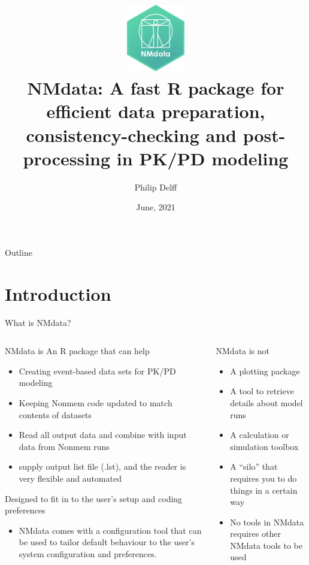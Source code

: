 \documentclass[
  8pt,
  ignorenonframetext,
  aspectratio=169]{beamer}
\title{\includegraphics[width=1in,height=\textheight]{../../man/figures/NMdata_logo_v01.png}\\
NMdata: A fast R package for efficient data preparation,
consistency-checking and post-processing in PK/PD modeling}
\author{Philip Delff}
\date{June, 2021}
\providecommand{\tightlist}{%
  \setlength{\itemsep}{0pt}\setlength{\parskip}{0pt}}
\begin{document}
\frame{\titlepage}

\begin{frame}
\end{frame}

\begin{frame}{Outline}
\protect\hypertarget{outline}{}
\tableofcontents[hideallsubsections]
\end{frame}

\hypertarget{introduction}{%
\section{Introduction}\label{introduction}}

\begin{frame}{What is NMdata?}
\protect\hypertarget{what-is-nmdata}{}
\begin{columns}[T]
\begin{column}{0.48\textwidth}
\begin{block}{NMdata is}
\protect\hypertarget{nmdata-is}{}
An R package that can help

\begin{itemize}
\tightlist
\item
  Creating event-based data sets for PK/PD modeling
\item
  Keeping Nonmem code updated to match contents of datasets
\item
  Read all output data and combine with input data from Nonmem runs
\item
  supply output list file (.lst), and the reader is very flexible and
  automated
\end{itemize}

Designed to fit in to the user's setup and coding preferences

\begin{itemize}
\tightlist
\item
  NMdata comes with a configuration tool that can be used to tailor
  default behaviour to the user's system configuration and preferences.
\end{itemize}
\end{block}
\end{column}

\begin{column}{0.48\textwidth}
\begin{block}{NMdata is not}
\protect\hypertarget{nmdata-is-not}{}
\begin{itemize}
\item
  A plotting package
\item
  A tool to retrieve details about model runs
\item
  A calculation or simulation toolbox
\item
  A ``silo'' that requires you to do things in a certain way
\item
  No tools in NMdata requires other NMdata tools to be used
\end{itemize}
\end{block}
\end{column}
\end{columns}


\end{frame}
\end{document}
